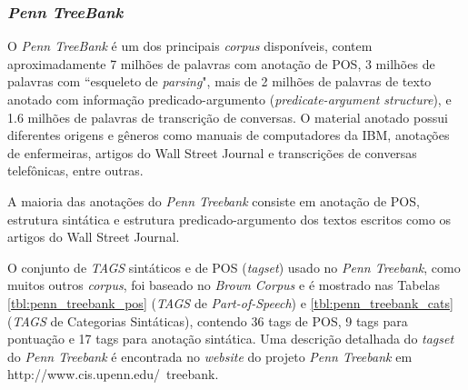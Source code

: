 \subsubsection{\emph{Penn TreeBank}}
\label{sub:corpus_ingles_esquema_pen}

O \emph{Penn TreeBank} é um dos principais \emph{corpus} disponíveis, contem aproximadamente 7 milhões de palavras com anotação de POS, 3 milhões de palavras com ``esqueleto de \emph{parsing}", mais de 2 milhões de palavras de texto anotado com informação predicado-argumento (\emph{predicate-argument structure}), e 1.6 milhões de palavras de transcrição de conversas. O material anotado possui diferentes origens e gêneros como manuais de computadores da IBM, anotações de enfermeiras, artigos do Wall Street Journal e transcrições de conversas telefônicas, entre outras.

A maioria das anotações do \emph{Penn Treebank} consiste em anotação de POS, estrutura sintática e estrutura predicado-argumento dos textos escritos como os artigos do Wall Street Journal.

O conjunto de \emph{TAGS} sintáticos e de POS (\emph{tagset}) usado no \emph{Penn Treebank}, como muitos outros \emph{corpus}, foi baseado no \emph{Brown Corpus} e é mostrado nas Tabelas \ref{tbl:penn_treebank_pos} (\emph{TAGS} de \emph{Part-of-Speech}) e \ref{tbl:penn_treebank_cats} (\emph{TAGS} de Categorias Sintáticas), contendo 36 tags de POS, 9 tags para pontuação e 17 tags para anotação sintática. Uma descrição detalhada do \emph{tagset} do \emph{Penn Treebank} é encontrada no \emph{website} do projeto \emph{Penn Treebank} em http://www.cis.upenn.edu/~treebank.

